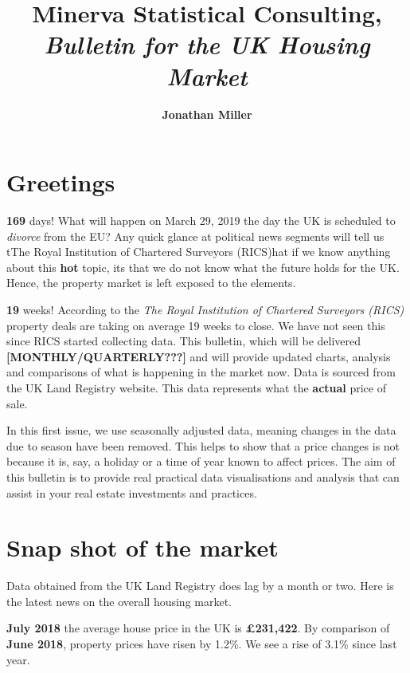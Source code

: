 \documentclass[letterpaper]{scrartcl}
\begin{document}
    \title{\color{triton_green}\textbf{Minerva Statistical Consulting},\\ \textit{\textbf{Bulletin for the UK Housing Market}}}
    \author{\color{triton_green}\textbf{Jonathan Miller}}
    \date{}
\AddToShipoutPictureBG*{%
  \AtTextLowerLeft{%
    \makebox[\textwidth]{%
      \raisebox{\dimexpr\textheight-\height}%
    }%
  }%
}
	\maketitle
	\section*{\color{triton_green}Greetings}
    	\textbf{\color{triton_green}169} days! What will happen on March 29, 2019 the day the UK is scheduled to \textit{divorce} from the EU? Any quick glance at political news segments will tell us tThe Royal Institution of Chartered Surveyors (RICS)hat if we know anything about this \textbf{\color{red}hot} topic, its that we do not know what the future holds for the UK. Hence, the property market is left exposed to the elements. 
    	
    	\textbf{\color{triton_green}19} weeks! According to the \textit{The Royal Institution of Chartered Surveyors (RICS)} property deals are taking on average 19 weeks to close. We have not seen this since RICS started collecting data. This bulletin, which will be delivered \textbf{[MONTHLY/QUARTERLY???]} and will provide updated charts, analysis and comparisons of what is happening in the market now. Data is sourced from the UK Land Registry website. This data represents what the \textbf{actual} price of sale. 
    	
    	In this first issue, we use seasonally adjusted data, meaning changes in the data due to season have been removed. This helps to show that a price changes is not because it is, say, a holiday or a time of year known to affect prices. The aim of this bulletin is to provide real practical data visualisations and analysis that can assist in your real estate investments and practices.
	
		
    \section*{\color{triton_green}Snap shot of the market}
        Data obtained from the UK Land Registry does lag by a month or two. Here is the latest news on the overall housing market.
        \begin{mdframed}[style=MyFrame]
        \textbf{July 2018} the average house price in the UK is \textbf{£231,422}. By comparison of \textbf{June 2018}, property prices have risen by 1.2\%. We see a rise of 3.1\% since last year. 
        \end{mdframed}
    
\end{document}
